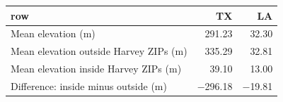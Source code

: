 \begin{tabular}{lrr}
  \hline
row & TX & LA \\ 
  \hline
Mean elevation (m) & 291.23 & 32.30 \\ 
  Mean elevation outside Harvey ZIPs (m) & 335.29 & 32.81 \\ 
  Mean elevation inside Harvey ZIPs (m) & 39.10 & 13.00 \\ 
  Difference: inside minus outside (m) & $-$296.18 & $-$19.81 \\ 
   \hline
\end{tabular}
